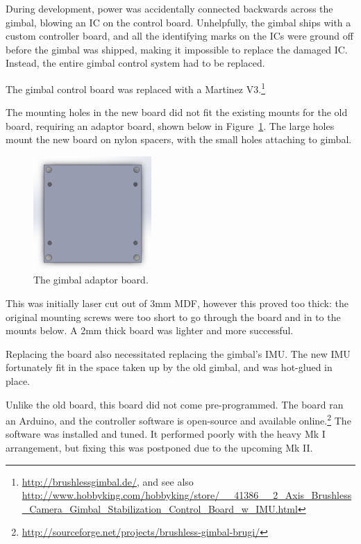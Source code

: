 \documentclass[12pt,oneside,a4paper]{book}
\begin{document}
During development, power was accidentally connected backwards across
the gimbal, blowing an \gls{IC} on the control board. Unhelpfully, the
gimbal ships with a custom controller board, and all the identifying
marks on the ICs were ground off before the gimbal was shipped, making
it impossible to replace the damaged IC. Instead, the entire gimbal
control system had to be replaced.

The gimbal control board was replaced with a Martinez
V3.\footnote{\url{http://brushlessgimbal.de/}, and see also \url{http://www.hobbyking.com/hobbyking/store/__41386__2_Axis_Brushless_Camera_Gimbal_Stabilization_Control_Board_w_IMU.html}}

The mounting holes in the new board did not fit the existing mounts
for the old board, requiring an adaptor board, shown below in
Figure~\ref{fig:gmb}. The large holes mount the new board on nylon
spacers, with the small holes attaching to gimbal.

\begin{figure}[h]
  \centering
  \includegraphics[width=0.4\textwidth]{figs/gmb}
  \caption{The gimbal adaptor board.}
  \label{fig:gmb}
\end{figure}

This was initially laser cut out of 3mm \gls{MDF}, however this proved
too thick: the original mounting screws were too short to go through
the board and in to the mounts below. A 2mm thick board was lighter
and more successful.
 
Replacing the board also necessitated replacing the gimbal's
\gls{IMU}. The new IMU fortunately fit in the space taken up by the
old gimbal, and was hot-glued in place.

Unlike the old board, this board did not come pre-programmed. The
board ran an Arduino, and the controller software is open-source and
available
online.\footnote{\url{http://sourceforge.net/projects/brushless-gimbal-brugi/}}
The software was installed and tuned. It performed poorly with the
heavy Mk I arrangement, but fixing this was postponed due to the
upcoming Mk II.
\newpage
\end{document}
